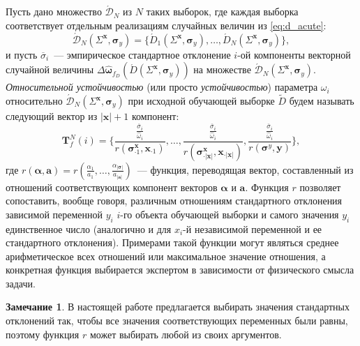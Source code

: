 \documentclass[12pt,a4paper]{article}
\theoremstyle{definition}
\newtheorem{note}{Замечание}
\begin{document}
Пусть дано множество $\acute{\mathcal{D}}_N$ из $N$ таких выборок, где каждая выборка
соответствует отдельным реализациям случайных величин из \eqref{eq:d_acute}:
\[
  \acute{\mathcal{D}}_N (\Sigma^{\mathbf{x}}, \boldsymbol{\sigma}_y) = \{ \acute{D}_1 (\Sigma^{\mathbf{x}}, \boldsymbol{\sigma}_y), \dots, \acute{D}_N (\Sigma^{\mathbf{x}}, \boldsymbol{\sigma}_y) \},
\]
и пусть $\overline{\sigma}_i$~--- эмпирическое стандартное отклонение $i$-ой компоненты
векторной случайной величины
$ \Delta\hat{\boldsymbol{\omega}}_{f_D}(\acute{D} (\Sigma^{\mathbf{x}}, \boldsymbol{\sigma}_y) ) $
на множестве $\acute{\mathcal{D}}_N (\Sigma^{\mathbf{x}}, \boldsymbol{\sigma}_y)$.
\emph{Относительной устойчивостью} (или просто \emph{устойчивостью}) параметра
$\omega_i$ относительно $\acute{\mathcal{D}}_N (\Sigma^{\mathbf{x}}, \boldsymbol{\sigma}_y)$
при исходной обучающей выборке $\tilde{D}$ будем называть следующий вектор
из $| \mathbf{x} | + 1$ компонент:
\begin{equation}
  \mathbf{T}^N_f(i) = \big\{ \frac{\frac{\overline{\sigma}_i}{\hat{\omega}_i}}{r(\boldsymbol{\sigma}^\mathbf{x}_{\cdot 1}, \mathbf{x}_{\cdot 1})}, \dots, \frac{\frac{\overline{\sigma}_i}{\hat{\omega}_i}}{r(\boldsymbol{\sigma}^\mathbf{x}_{\cdot |\mathbf{x}|}, \mathbf{x}_{\cdot |\mathbf{x}|})}, \frac{\frac{\overline{\sigma}_i}{\hat{\omega}_i}}{r(\boldsymbol{\sigma}^y, \mathbf{y})} \big\},
  \label{eq:t_rel}
\end{equation}
где $r(\boldsymbol{\alpha}, \mathbf{a}) = r(\frac{\alpha_1}{a_1}, \dots, \frac{\alpha_{|\boldsymbol{\sigma}|}}{a_{|\mathbf{a}|}})$~---
функция, переводящая вектор, составленный из отношений соответствующих компонент векторов $\boldsymbol{\alpha}$ и $\mathbf{a}$.
Функция $r$ позволяет сопоставить, вообще говоря, различным отношениям стандартного
отклонения зависимой переменной $y_i$ $i$-го объекта обучающей выборки и самого значения $y_i$
единственное число (аналогично и для $x_i$-й независимой переменной и ее стандартного отклонения).
Примерами такой функции могут являться среднее арифметическое
всех отношений или максимальное значение отношения, а конкретная функция выбирается
экспертом в зависимости от физического смысла задачи.

\begin{note}
В настоящей работе предлагается выбирать значения стандартных отклонений так, чтобы
все значения соответствующих переменных были равны, поэтому функция $r$ может выбирать
любой из своих аргументов.
\label{note:r_equality}
\end{note}
\end{document}
